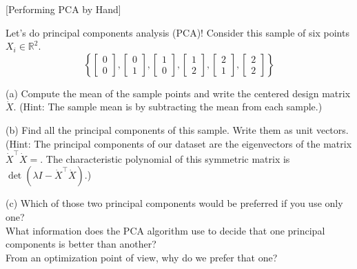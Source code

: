 \item {} [Performing PCA by Hand]

Let's do principal components analysis (PCA)! Consider this sample of six points $X_i \in \mathbb{R}^2$.
$$\left\{
\left[\begin{array}{l} 0 \\ 0 \end{array}\right],
\left[\begin{array}{l} 0 \\ 1 \end{array}\right],
\left[\begin{array}{l} 1 \\ 0 \end{array}\right],
\left[\begin{array}{l} 1 \\ 2 \end{array}\right],
\left[\begin{array}{l} 2 \\ 1 \end{array}\right],
\left[\begin{array}{l} 2 \\ 2 \end{array}\right]\right\}$$

(a) Compute the mean of the sample points and write the centered design matrix $\dot{X}$. 
(Hint: The sample mean is by subtracting the mean from each sample.)

(b) Find all the principal components of this sample. Write them as unit vectors. 
(Hint: The principal components of our dataset are the eigenvectors of the matrix $\dot{X}^{\top} \dot{X}=
$. The characteristic polynomial of this symmetric matrix is $\det\left(\lambda I-\dot{X}^{\top} \dot{X}\right)$.)

(c) Which of those two principal components would be preferred if you use only one?  \\
What information does the PCA algorithm use to decide that one principal components is better than another?  \\
From an optimization point of view, why do we prefer that one? 

\solution










\newpage